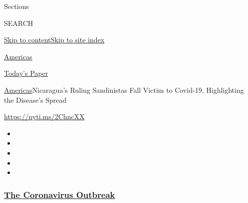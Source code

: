 Sections

SEARCH

\protect\hyperlink{site-content}{Skip to
content}\protect\hyperlink{site-index}{Skip to site index}

\href{https://www.nytimes3xbfgragh.onion/section/world/americas}{Americas}

\href{https://myaccount.nytimes3xbfgragh.onion/auth/login?response_type=cookie\&client_id=vi}{}

\href{https://www.nytimes3xbfgragh.onion/section/todayspaper}{Today's
Paper}

\href{/section/world/americas}{Americas}\textbar{}Nicaragua's Ruling
Sandinistas Fall Victim to Covid-19, Highlighting the Disease's Spread

\url{https://nyti.ms/2ChncXX}

\begin{itemize}
\item
\item
\item
\item
\item
\end{itemize}

\hypertarget{the-coronavirus-outbreak}{%
\subsubsection{\texorpdfstring{\href{https://www.nytimes3xbfgragh.onion/news-event/coronavirus?name=styln-coronavirus-national\&region=TOP_BANNER\&variant=undefined\&block=storyline_menu_recirc\&action=click\&pgtype=Article\&impression_id=174f1410-e387-11ea-bbe1-53730119d2f5}{The
Coronavirus
Outbreak}}{The Coronavirus Outbreak}}\label{the-coronavirus-outbreak}}

